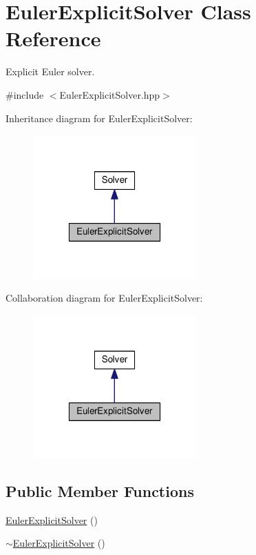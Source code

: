 \hypertarget{classEulerExplicitSolver}{\section{Euler\+Explicit\+Solver Class Reference}
\label{classEulerExplicitSolver}
}


Explicit Euler solver.  




{\ttfamily \#include $<$Euler\+Explicit\+Solver.\+hpp$>$}



Inheritance diagram for Euler\+Explicit\+Solver\+:\nopagebreak
\begin{figure}[H]
\begin{center}
\leavevmode
\includegraphics[width=178pt]{classEulerExplicitSolver__inherit__graph}
\end{center}
\end{figure}


Collaboration diagram for Euler\+Explicit\+Solver\+:\nopagebreak
\begin{figure}[H]
\begin{center}
\leavevmode
\includegraphics[width=178pt]{classEulerExplicitSolver__coll__graph}
\end{center}
\end{figure}
\subsection*{Public Member Functions}
\begin{DoxyCompactItemize}
\item 
\hyperlink{classEulerExplicitSolver_a6484746b2b67ee17597f63a5028df2fa}{Euler\+Explicit\+Solver} ()
\item 
\hyperlink{classEulerExplicitSolver_a84711eba5ad543c2a142f64d23de1bf6}{$\sim$\+Euler\+Explicit\+Solver} ()
\end{DoxyCompactItemize}
